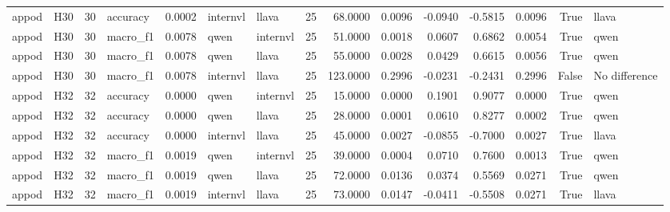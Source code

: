 \begin{table}[tbp]
\begin{tabular}{llrlrllrrrrrrrl}
appod & H30 & 30 & accuracy & 0.0002 & internvl & llava & 25 & 68.0000 & 0.0096 & -0.0940 & -0.5815 & 0.0096 & True & llava \\
appod & H30 & 30 & macro\_f1 & 0.0078 & qwen & internvl & 25 & 51.0000 & 0.0018 & 0.0607 & 0.6862 & 0.0054 & True & qwen \\
appod & H30 & 30 & macro\_f1 & 0.0078 & qwen & llava & 25 & 55.0000 & 0.0028 & 0.0429 & 0.6615 & 0.0056 & True & qwen \\
appod & H30 & 30 & macro\_f1 & 0.0078 & internvl & llava & 25 & 123.0000 & 0.2996 & -0.0231 & -0.2431 & 0.2996 & False & No difference \\
appod & H32 & 32 & accuracy & 0.0000 & qwen & internvl & 25 & 15.0000 & 0.0000 & 0.1901 & 0.9077 & 0.0000 & True & qwen \\
appod & H32 & 32 & accuracy & 0.0000 & qwen & llava & 25 & 28.0000 & 0.0001 & 0.0610 & 0.8277 & 0.0002 & True & qwen \\
appod & H32 & 32 & accuracy & 0.0000 & internvl & llava & 25 & 45.0000 & 0.0027 & -0.0855 & -0.7000 & 0.0027 & True & llava \\
appod & H32 & 32 & macro\_f1 & 0.0019 & qwen & internvl & 25 & 39.0000 & 0.0004 & 0.0710 & 0.7600 & 0.0013 & True & qwen \\
appod & H32 & 32 & macro\_f1 & 0.0019 & qwen & llava & 25 & 72.0000 & 0.0136 & 0.0374 & 0.5569 & 0.0271 & True & qwen \\
appod & H32 & 32 & macro\_f1 & 0.0019 & internvl & llava & 25 & 73.0000 & 0.0147 & -0.0411 & -0.5508 & 0.0271 & True & llava \\
\bottomrule
\end{tabular}
\end{table}
